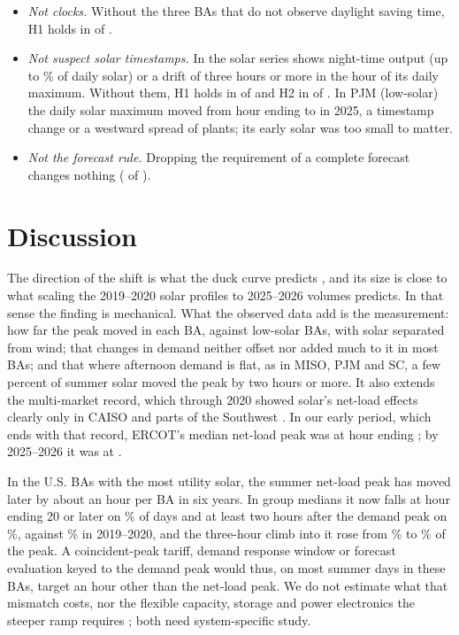 \documentclass[conference,a4paper]{IEEEtran}
\begin{document}
\begin{itemize}
\item \emph{Not clocks.} Without the three BAs that do not observe daylight saving time, H1 holds in  of .
\item \emph{Not suspect solar timestamps.} In  the solar series shows night-time output (up to \% of daily solar) or a drift of three hours or more in the hour of its daily maximum. Without them, H1 holds in  of  and H2 in  of . In PJM (low-solar) the daily solar maximum moved from hour ending  to  in 2025, a timestamp change or a westward spread of plants; its early solar was too small to matter.
\item \emph{Not the forecast rule.} Dropping the requirement of a complete forecast changes nothing ( of ).
\end{itemize}

\section{Discussion}

The direction of the shift is what the duck curve predicts \cite{denholm2015duck}, and its size is close to what scaling the 2019--2020 solar profiles to 2025--2026 volumes predicts. In that sense the finding is mechanical. What the observed data add is the measurement: how far the peak moved in each BA, against low-solar BAs, with solar separated from wind; that changes in demand neither offset nor added much to it in most BAs; and that where afternoon demand is flat, as in MISO, PJM and SC, a few percent of summer solar moved the peak by two hours or more. It also extends the multi-market record, which through 2020 showed solar's net-load effects clearly only in CAISO and parts of the Southwest \cite{mills2021solar2grid}. In our early period, which ends with that record, ERCOT's median net-load peak was at hour ending ; by 2025--2026 it was at .

In the U.S. BAs with the most utility solar, the summer net-load peak has moved later by about an hour per BA in six years. In group medians it now falls at hour ending 20 or later on \% of days and at least two hours after the demand peak on \%, against \% in 2019--2020, and the three-hour climb into it rose from \% to \% of the peak. A coincident-peak tariff, demand response window or forecast evaluation keyed to the demand peak would thus, on most summer days in these BAs, target an hour other than the net-load peak. We do not estimate what that mismatch costs, nor the flexible capacity, storage and power electronics the steeper ramp requires \cite{kroposki2017renewable}; both need system-specific study.
\end{document}
